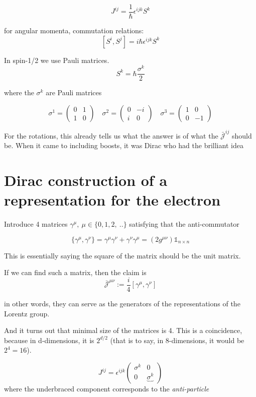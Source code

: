 \documentclass[11pt]{article}
\begin{document}
	\[ J^{ij} = \frac{1}{\hbar}\epsilon^{ijk} S^{k}\]

for angular momenta, commutation relations: \[ [S^i, S^j] = i \hbar \epsilon^{ijk} S^k\]

	In spin-1/2 we use Pauli matrices. \[ S^k = \hbar \frac{\sigma^k}{2}\]
	
	where the $\sigma^k$ are Pauli matrices
	
	\[ \sigma^1 = \begin{pmatrix}
		0 & 1 \\ 1 & 0
	\end{pmatrix} \quad \sigma^2 = \begin{pmatrix}
	0 & -i \\ i & 0
\end{pmatrix} \quad \sigma^3 = \begin{pmatrix}
1 & 0 \\ 0 & -1
\end{pmatrix}\]

For the rotations, this already tells us what the answer is of what the $\bar{\mathcal{J}}^{ij}$ should be. When it came to including boosts, it was Dirac who had the brilliant idea

\section*{Dirac construction of a representation for the electron}

Introduce 4 matrices $\gamma^\mu,\ \mu \in \{0, 1, 2,\ ..\}$ satisfying that the anti-commutator

\[ \{ \gamma^\mu, \gamma^\nu \} = \gamma^\mu\gamma^\nu + \gamma^\nu\gamma^\mu =  (2g^{\mu\nu})\mathbb{1}_{n\times n} \]

This is essentially saying the square of the matrix should be the unit matrix.

If we can find such a matrix, then the claim is \[ \bar{\mathcal{J}}^{\mu\nu} := \frac{i}{4} [\gamma^\mu, \gamma^\nu]\]

in other words, they can serve as the generators of the representations of the Lorentz group.


And it turns out that minimal size of the matrices is 4. This is a coincidence, because in d-dimensions, it is $2^{d/2}$ (that is to say, in 8-dimensions, it would be $2^4 = 16$).


\[ J^{ij} = \epsilon^{ijk} \begin{pmatrix}
	\sigma^k & 0 \\ 0 & \underbrace{\sigma^k}
\end{pmatrix} \]
where the underbraced component corresponds to the \textit{anti-particle}
\end{document}
